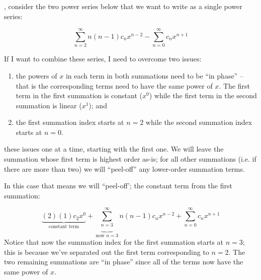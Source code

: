 , consider the two power series below that we want to write as a single power series:

\begin{equation*}
\sum\limits_{n=2}^{\infty} n(n-1)c_n x^{n-2} - \sum\limits_{n=0}^{\infty} c_n x^{n+1}
\end{equation*}

If I want to combine these series, I need to overcome two issues:
\begin{enumerate}

\item the powers of $x$ in each term in both summations need to be ``in phase'' -- that is the corresponding terms need to have the same power of $x$.  The first term in the first summation is constant ($x^0$) while the first term in the second summation is linear ($x^1$); and 


\item the first summation index starts at $n=2$ while the second summation index starts at $n=0$.

\end{enumerate}


 these issues one at a time, starting with the first one.  We will leave the summation whose first term is highest order as-is; for all other summations (i.e. if there are more than two) we will ``peel-off'' any lower-order summation terms.

In this case that means we will ``peel-off'; the constant term from the first summation:

$$\underbrace{(2)(1)c_2x^0}_{\text{constant term}} + \underbrace{\sum\limits_{n=3}^{\infty}}_{\text{now }n=3} n(n-1)c_nx^{n-2} + \sum\limits_{n=0}^{\infty}c_nx^{n+1}$$
Notice that now the summation index for the first summation starts at $n=3$; this is because we've separated out the first term corresponding to $n=2$.  The two remaining summations are ``in phase'' since all of the terms now have the same power of $x$.

